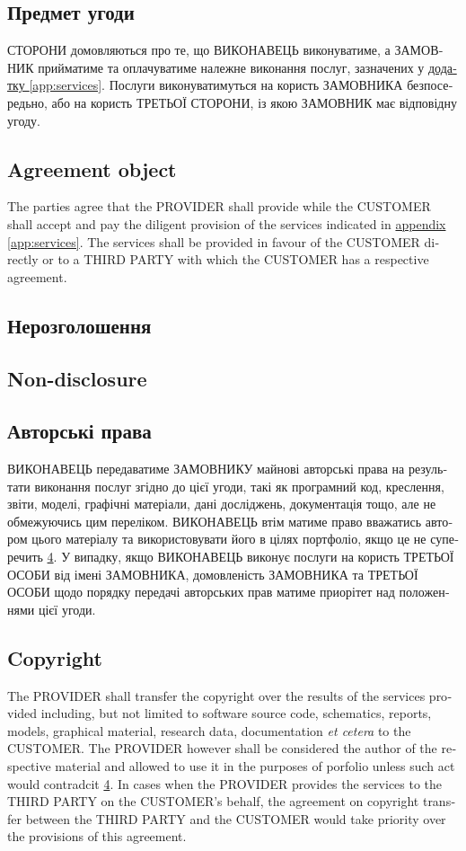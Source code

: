 \documentclass[a4paper]{article}
\newcommand\freetextcommon[3]{\begin{ukrainian}#1\end{ukrainian}\switchcolumn\begin{english}#2\end{english}\switchcolumn\begin{estonian}#3\end{estonian}}
\newcommand\freetext[3]{\freetextcommon{#1}{#2}{#3}\switchcolumn*}
\newcommand\clause[6]{\freetext{\section{#1}#4}{\section{#2}#5}{\section{#3}#6}}
\newcommand\smartref[2]{\hyperref[#1]{#2\ref{#1}}}
\begin{document}
\begin{Form}
\begin{paracol}{3}
        {}
      \clause
        {Предмет угоди}
        {Agreement object}
        {}
        {СТОРОНИ домовляються про те, що ВИКОНАВЕЦЬ виконуватиме, а ЗАМОВНИК прийматиме та оплачуватиме належне виконання послуг, зазначених у \smartref{app:services}{додатку }. Послуги виконуватимуться на користь ЗАМОВНИКА безпосередьно, або на користь ТРЕТЬОЇ СТОРОНИ, із якою ЗАМОВНИК має відповідну угоду.}
        {The parties agree that the PROVIDER shall provide while the CUSTOMER shall accept and pay the diligent provision of the services indicated in \smartref{app:services}{appendix }. The services shall be provided in favour of the CUSTOMER directly or to a THIRD PARTY with which the CUSTOMER has a respective agreement.}
        {}
      \clause
        {Нерозголошення}
        {Non-disclosure}
        {}
        {\label{sec:nda}}
        {}
        {}
      \clause
        {Авторські права}
        {Copyright}
        {}
        {ВИКОНАВЕЦЬ передаватиме ЗАМОВНИКУ майнові авторські права на результати виконання послуг згідно до цієї угоди, такі як програмний код, креслення, звіти, моделі, графічні матеріали, дані досліджень, документація тощо, але не обмежуючись цим переліком. ВИКОНАВЕЦЬ втім матиме право вважатись автором цього матеріалу та використовувати його в цілях портфоліо, якщо це не суперечить \smartref{sec:nda}{}. У випадку, якщо ВИКОНАВЕЦЬ виконує послуги на користь ТРЕТЬОЇ ОСОБИ від імені ЗАМОВНИКА, домовленість ЗАМОВНИКА та ТРЕТЬОЇ ОСОБИ щодо порядку передачі авторських прав матиме приорітет над положеннями цієї угоди.}
        {The PROVIDER shall transfer the copyright over the results of the services provided including, but not limited to software source code, schematics, reports, models, graphical material, research data, documentation \emph{et cetera} to the CUSTOMER. The PROVIDER however shall be considered the author of the respective material and allowed to use it in the purposes of porfolio unless such act would contradcit \smartref{sec:nda}{}. In cases when the PROVIDER provides the services to the THIRD PARTY on the CUSTOMER's behalf, the agreement on copyright transfer between the THIRD PARTY and the CUSTOMER would take priority over the provisions of this agreement.}
        {}
    \end{paracol}
  \appendix
  
  
  
  \end{Form}
\end{document}
